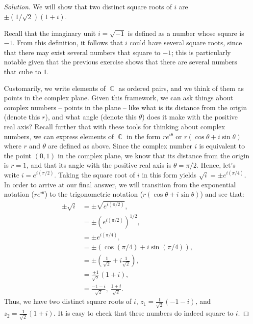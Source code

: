 \documentclass[letterpaper, 12pt]{amsart}
\DeclareMathOperator{\C}{\mathbb{C}}
\theoremstyle{definition}  %
\begin{document}
		\begin{proof}[Solution]
		We will show that two distinct square roots of $i$ are $\pm (1/\sqrt{2})(1 + i)$.

		Recall that the imaginary unit $i = \sqrt{-1}$ is defined as a number whose square is $-1$.
		From this definition, it follows that $i$ could have several square roots, since that there may exist several numbers that square to $-1$; this is particularly notable given that the previous exercise shows that there are several numbers that cube to $1$.
		
		Customarily, we write elements of $\C$ as ordered pairs, and we think of them as points in the complex plane.
		Given this framework, we can ask things about complex numbers -- points in the plane -- like what is its distance from the origin (denote this $r$), and what angle (denote this $\theta$) does it make with the positive real axis?
		Recall further that with these tools for thinking about complex numbers, we can express elements of $\C$ in the form $re^{i \theta}$ or $r(\cos{\theta} + i\sin{\theta})$ where $r$ and $\theta$ are defined as above.
		Since the complex number $i$ is equivalent to the point $(0,1)$ in the complex plane, we know that its distance from the origin is $r = 1$, and that its angle with the positive real axis is $\theta = \pi/2$.
		Hence, let's write $i = e^{i(\pi/2)}$.
		Taking the square root of $i$ in this form yields $\sqrt{i} = \pm e^{i(\pi/4)}$.
		In order to arrive at our final answer, we will transition from the exponential notation ($re^{i \theta}$) to the trigonometric notation ($r(\cos{\theta} + i\sin{\theta})$) and see that:
			\begin{align*}
			\pm\sqrt{i} &= \pm\sqrt{e^{i(\pi/2)}}, \\
			&= \pm \left( e^{i(\pi/2)} \right)^{1/2}, \\
			&= \pm e^{i(\pi/4)}, \\
			&= \pm \left( \cos{(\pi/4)} + i\sin{(\pi/4)} \right), \\
			&= \pm \left( \frac{1}{\sqrt{2}} + i \frac{1}{\sqrt{2}} \right), \\
			&= \frac{\pm 1}{\sqrt{2}} \left( 1 + i \right), \\
			&= \frac{-1 - i}{\sqrt{2}}, \ \frac{1 + i}{\sqrt{2}}.
			\end{align*}
		Thus, we have two distinct square roots of $i$, $z_{1} = \frac{1}{\sqrt{2}}(-1 - i)$, and $z_{2} = \frac{1}{\sqrt{2}}(1 + i)$.
		It is easy to check that these numbers do indeed square to $i$.
		\end{proof}
\end{document}

